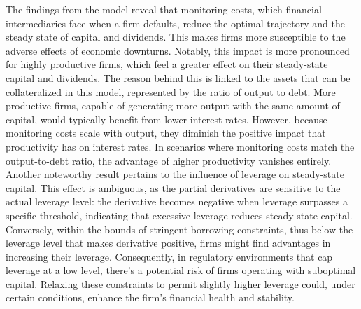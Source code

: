 \documentclass[12pt]{report}
\begin{document}
The findings from the model reveal that monitoring costs, which financial intermediaries face when a firm defaults,
reduce the optimal trajectory and the steady state of capital and dividends. This makes firms more susceptible to the
adverse effects of economic downturns. Notably, this impact is more pronounced for highly productive firms, which feel a
greater effect on their steady-state capital and dividends. The reason behind this is linked to the assets that can be
collateralized in this model, represented by the ratio of output to debt. More productive firms, capable of generating
more output with the same amount of capital, would typically benefit from lower interest rates. However, because
monitoring costs scale with output, they diminish the positive impact that productivity has on interest rates. In
scenarios where monitoring costs match the output-to-debt ratio, the advantage of higher productivity vanishes entirely. 
Another noteworthy result pertains to the influence of leverage on steady-state capital. This effect is ambiguous, as the
partial derivatives are sensitive to the actual leverage level: the derivative becomes negative when leverage surpasses
a specific threshold, indicating that excessive leverage reduces steady-state capital. Conversely, within the bounds of
stringent borrowing constraints, thus below the leverage level that makes derivative positive, firms might find advantages in increasing their leverage. Consequently, in regulatory
environments that cap leverage at a low level, there's a potential risk of firms operating with suboptimal capital.
Relaxing these constraints to permit slightly higher leverage could, under certain conditions, enhance the firm's
financial health and stability. 
\end{document}
